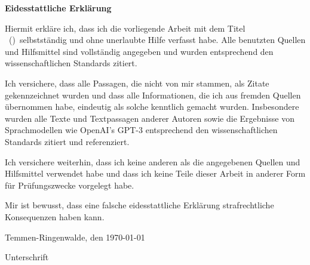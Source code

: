 \textbf{Eidesstattliche Erklärung}\vspace{0.3cm}

Hiermit erkläre ich, dass ich die vorliegende Arbeit mit dem Titel \glqq \bookTitle\ (\textit{\bookSubTitle})\grqq\ selbstständig und ohne unerlaubte Hilfe verfasst habe. Alle benutzten Quellen und Hilfsmittel sind vollständig angegeben und wurden entsprechend den wissenschaftlichen Standards zitiert.\vspace{0.3cm}

Ich versichere, dass alle Passagen, die nicht von mir stammen, als Zitate gekennzeichnet wurden und dass alle Informationen, die ich aus fremden Quellen übernommen habe, eindeutig als solche kenntlich gemacht wurden. Insbesondere wurden alle Texte und Textpassagen anderer Autoren sowie die Ergebnisse von Sprachmodellen wie OpenAI's GPT-3 entsprechend den wissenschaftlichen Standards zitiert und referenziert.\vspace{0.3cm}

Ich versichere weiterhin, dass ich keine anderen als die angegebenen Quellen und Hilfsmittel verwendet habe und dass ich keine Teile dieser Arbeit in anderer Form für Prüfungszwecke vorgelegt habe.\vspace{0.3cm}

Mir ist bewusst, dass eine falsche eidesstattliche Erklärung strafrechtliche Konsequenzen haben kann.\vspace{0.3cm}

Temmen-Ringenwalde, den \today\vspace{2.0cm}

Unterschrift



